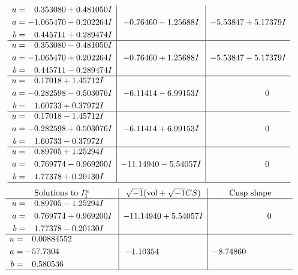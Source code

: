 \documentclass[1p]{elsarticle_modified}
\theoremstyle{definition}
\newcommand{\I}{\sqrt{-1}}
\begin{document}
$$\begin{array}{c|c|c}
\begin{aligned}
u &= \phantom{-}0.353080 + 0.481050 I \\
a &= -1.065470 - 0.202264 I \\
b &= \phantom{-}0.445711 + 0.289474 I\end{aligned}
 & -0.76460 - 1.25688 I & -5.53847 + 5.17379 I \\ \hline\begin{aligned}
u &= \phantom{-}0.353080 - 0.481050 I \\
a &= -1.065470 + 0.202264 I \\
b &= \phantom{-}0.445711 - 0.289474 I\end{aligned}
 & -0.76460 + 1.25688 I & -5.53847 - 5.17379 I \\ \hline\begin{aligned}
u &= \phantom{-}0.17018 + 1.45712 I \\
a &= -0.282598 - 0.503076 I \\
b &= \phantom{-}1.60733 + 0.37972 I\end{aligned}
 & -6.11414 - 6.99153 I & \phantom{-0.000000 } 0 \\ \hline\begin{aligned}
u &= \phantom{-}0.17018 - 1.45712 I \\
a &= -0.282598 + 0.503076 I \\
b &= \phantom{-}1.60733 - 0.37972 I\end{aligned}
 & -6.11414 + 6.99153 I & \phantom{-0.000000 } 0 \\ \hline\begin{aligned}
u &= \phantom{-}0.89705 + 1.25294 I \\
a &= \phantom{-}0.769774 - 0.969200 I \\
b &= \phantom{-}1.77378 + 0.20130 I\end{aligned}
 & -11.14940 - 5.54057 I & \phantom{-0.000000 } 0\\
 \hline 
 \end{array}$$\newpage$$\begin{array}{c|c|c}  
\text{Solutions to }I^u_{1}& \I (\text{vol} + \sqrt{-1}CS) & \text{Cusp shape}\\
 \hline 
\begin{aligned}
u &= \phantom{-}0.89705 - 1.25294 I \\
a &= \phantom{-}0.769774 + 0.969200 I \\
b &= \phantom{-}1.77378 - 0.20130 I\end{aligned}
 & -11.14940 + 5.54057 I & \phantom{-0.000000 } 0 \\ \hline\begin{aligned}
u &= \phantom{-}0.00884552\phantom{ +0.000000I} \\
a &= -57.7304\phantom{ +0.000000I} \\
b &= \phantom{-}0.580536\phantom{ +0.000000I}\end{aligned}
 & -1.10354\phantom{ +0.000000I} & -8.74860\phantom{ +0.000000I}\\
 \hline 
 \end{array}$$\newpage\newpage\renewcommand{\arraystretch}{1}
\end{document}
